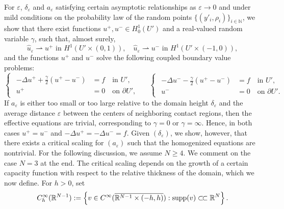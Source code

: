 \documentclass{article}
\numberwithin{equation}{section}
\theoremstyle{definition}
\theoremstyle{remark}
\newcommand{\csubset}{\subset\joinrel\subset}
\newcommand{\supp}{\operatorname{supp}}
\begin{document}
For $\varepsilon$, $\delta_\varepsilon$ and $a_\varepsilon$ satisfying certain asymptotic relationships as $\varepsilon \to 0$ and under mild conditions on the probability law of the random points $\{(y'_i, \rho_i)\}_{i \in \mathbb{N}}$, we show that there exist functions $u^+, u^- \in H_0^1(U')$ and a real-valued random variable $\gamma$, such that, almost surely,
\begin{equation} \label{eq:rescaled_convergence}
    \hat{u}_\varepsilon \rightharpoonup u^+ \text{ in } H^1(U' \times (0, 1)), \quad \hat{u}_\varepsilon \rightharpoonup u^- \text{ in } H^1(U' \times (-1, 0)),
\end{equation}
and the functions $u^+$ and $u^-$ solve the following coupled boundary value problems:
\begin{equation} \label{eq:limit_equations}
    \begin{cases}
        \begin{aligned}
            -\Delta u^+ + \frac{\gamma}{2}(u^+ - u^-) &= f \quad \text{in } U', \\
            u^+ &= 0 \quad \text{on } \partial U',
        \end{aligned}
    \end{cases}
    \quad
    \begin{cases}
        \begin{aligned}
            -\Delta u^- - \frac{\gamma}{2}(u^+ - u^-) &= f \quad \text{in } U', \\
            u^- &= 0 \quad \text{on } \partial U'.
        \end{aligned}
    \end{cases}    
\end{equation}
If $a_\varepsilon$ is either too small or too large relative to the domain height $\delta_\varepsilon$ and the average distance $\varepsilon$ between the centers of neighboring contact regions, then the effective equations are trivial, corresponding to $\gamma = 0$ or $\gamma = \infty$. Hence, in both cases $u^+ = u^-$ and $-\Delta u^+ = -\Delta u^- = f$. Given $(\delta_\varepsilon)$, we show, however, that there exists a critical scaling for $(a_\varepsilon)$ such that the homogenized equations are nontrivial. For the following discussion, we assume $N \ge 4$. We comment on the case $N = 3$ at the end. The critical scaling depends on the growth of a certain capacity function with respect to the relative thickness of the domain, which we now define. For $h > 0$, set
\[
C_h^\infty(\mathbb{R}^{N - 1}) := \left\{v \in C^\infty(\overline{\mathbb{R}^{N - 1} \times (-h, h)}) : \supp(v) \csubset \mathbb{R}^N\right\}.
\]
\end{document}
